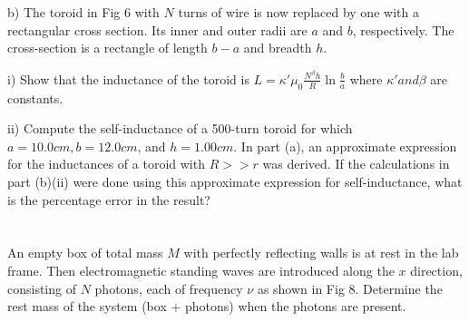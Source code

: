 \documentclass{article}
\newcommand{\<}{\langle}
\renewcommand{\>}{\rangle}
\begin{document}
b) The toroid in Fig 6 with $N$ turns of wire is now replaced by one with a rectangular cross section. Its inner and outer radii are $a$ and $b$, respectively. The cross-section is a rectangle of length $b-a$ and breadth $h$.

i) Show that the inductance of the toroid is $L = \kappa'\mu_0\frac{N^\beta h}{R} \ln\frac{b}{a}$ where $\kappa' and \beta$ are constants.

ii) Compute the self-inductance of a 500-turn toroid for which $a=10.0cm, b=12.0cm$, and $h=1.00cm$. In part (a), an approximate expression for the inductances of a toroid with $R >> r$ was derived. If the calculations in part (b)(ii) were done using this approximate expression for self-inductance, what is the percentage error in the result?

\section{}

An empty box of total mass $M$ with perfectly reflecting walls is at rest in the lab frame. Then electromagnetic standing waves are introduced along the $x$ direction, consisting of $N$ photons, each of frequency $\nu$ as shown in Fig 8. Determine the rest mass of the system (box + photons) when the photons are present.
\end{document}
